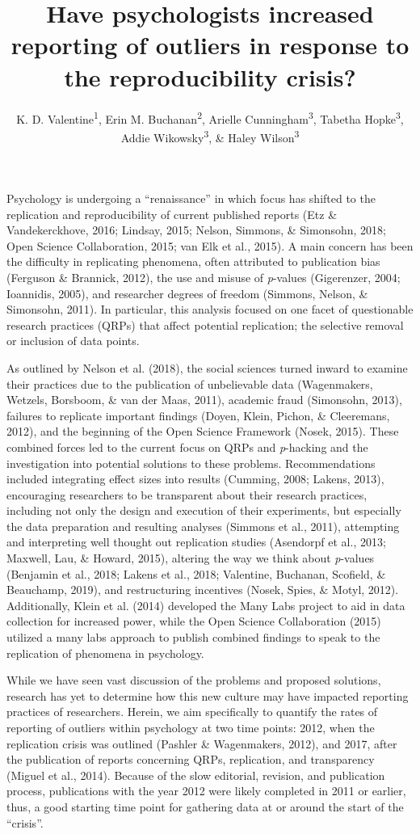 \documentclass[english,,man]{apa6}
\title{Have psychologists increased reporting of outliers in response to the
reproducibility crisis?}
\author{K. D. Valentine\textsuperscript{1}, Erin M. Buchanan\textsuperscript{2},
Arielle Cunningham\textsuperscript{3}, Tabetha Hopke\textsuperscript{3},
Addie Wikowsky\textsuperscript{3}, \& Haley Wilson\textsuperscript{3}}
\date{}
\affiliation{
\vspace{0.5cm}
\textsuperscript{1} Massachusetts General Hospital\\\textsuperscript{2} Harrisburg University of Science and Technology\\\textsuperscript{3} Missouri State University}
\theoremstyle{definition}
\theoremstyle{definition}
\theoremstyle{definition}
\theoremstyle{remark}
\begin{document}
\maketitle

Psychology is undergoing a \enquote{renaissance} in which focus has
shifted to the replication and reproducibility of current published
reports (Etz \& Vandekerckhove, 2016; Lindsay, 2015; Nelson, Simmons, \&
Simonsohn, 2018; Open Science Collaboration, 2015; van Elk et al.,
2015). A main concern has been the difficulty in replicating phenomena,
often attributed to publication bias (Ferguson \& Brannick, 2012), the
use and misuse of \emph{p}-values (Gigerenzer, 2004; Ioannidis, 2005),
and researcher degrees of freedom (Simmons, Nelson, \& Simonsohn, 2011).
In particular, this analysis focused on one facet of questionable
research practices (QRPs) that affect potential replication; the
selective removal or inclusion of data points.

As outlined by Nelson et al. (2018), the social sciences turned inward
to examine their practices due to the publication of unbelievable data
(Wagenmakers, Wetzels, Borsboom, \& van der Maas, 2011), academic fraud
(Simonsohn, 2013), failures to replicate important findings (Doyen,
Klein, Pichon, \& Cleeremans, 2012), and the beginning of the Open
Science Framework (Nosek, 2015). These combined forces led to the
current focus on QRPs and \emph{p}-hacking and the investigation into
potential solutions to these problems. Recommendations included
integrating effect sizes into results (Cumming, 2008; Lakens, 2013),
encouraging researchers to be transparent about their research
practices, including not only the design and execution of their
experiments, but especially the data preparation and resulting analyses
(Simmons et al., 2011), attempting and interpreting well thought out
replication studies (Asendorpf et al., 2013; Maxwell, Lau, \& Howard,
2015), altering the way we think about \emph{p}-values (Benjamin et al.,
2018; Lakens et al., 2018; Valentine, Buchanan, Scofield, \& Beauchamp,
2019), and restructuring incentives (Nosek, Spies, \& Motyl, 2012).
Additionally, Klein et al. (2014) developed the Many Labs project to aid
in data collection for increased power, while the Open Science
Collaboration (2015) utilized a many labs approach to publish combined
findings to speak to the replication of phenomena in psychology.

While we have seen vast discussion of the problems and proposed
solutions, research has yet to determine how this new culture may have
impacted reporting practices of researchers. Herein, we aim specifically
to quantify the rates of reporting of outliers within psychology at two
time points: 2012, when the replication crisis was outlined (Pashler \&
Wagenmakers, 2012), and 2017, after the publication of reports
concerning QRPs, replication, and transparency (Miguel et al., 2014).
Because of the slow editorial, revision, and publication process,
publications with the year 2012 were likely completed in 2011 or
earlier, thus, a good starting time point for gathering data at or
around the start of the \enquote{crisis}.
\end{document}
